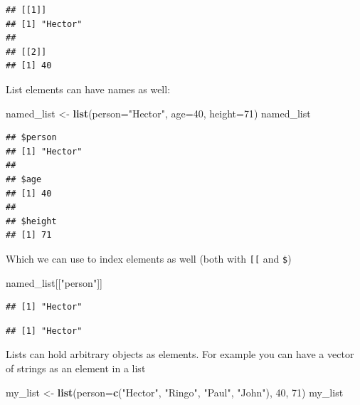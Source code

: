 \documentclass[12pt,]{book}
\newenvironment{Shaded}{\begin{snugshade}}{\end{snugshade}}
\newcommand{\KeywordTok}[1]{\textcolor[rgb]{0.13,0.29,0.53}{\textbf{#1}}}
\newcommand{\DataTypeTok}[1]{\textcolor[rgb]{0.13,0.29,0.53}{#1}}
\newcommand{\DecValTok}[1]{\textcolor[rgb]{0.00,0.00,0.81}{#1}}
\newcommand{\StringTok}[1]{\textcolor[rgb]{0.31,0.60,0.02}{#1}}
\newcommand{\OperatorTok}[1]{\textcolor[rgb]{0.81,0.36,0.00}{\textbf{#1}}}
\newcommand{\NormalTok}[1]{#1}
\theoremstyle{definition}
\theoremstyle{definition}
\theoremstyle{remark}
\begin{document}
\begin{verbatim}
## [[1]]
## [1] "Hector"
## 
## [[2]]
## [1] 40
\end{verbatim}

List elements can have names as well:

\begin{Shaded}
\begin{Highlighting}[]
\NormalTok{named_list <-}\StringTok{ }\KeywordTok{list}\NormalTok{(}\DataTypeTok{person=}\StringTok{"Hector"}\NormalTok{, }\DataTypeTok{age=}\DecValTok{40}\NormalTok{, }\DataTypeTok{height=}\DecValTok{71}\NormalTok{)}
\NormalTok{named_list}
\end{Highlighting}
\end{Shaded}

\begin{verbatim}
## $person
## [1] "Hector"
## 
## $age
## [1] 40
## 
## $height
## [1] 71
\end{verbatim}

Which we can use to index elements as well (both with \texttt{{[}{[}}
and \texttt{\$})

\begin{Shaded}
\begin{Highlighting}[]
\NormalTok{named_list[[}\StringTok{"person"}\NormalTok{]]}
\end{Highlighting}
\end{Shaded}

\begin{verbatim}
## [1] "Hector"
\end{verbatim}

\begin{Shaded}
\end{Shaded}

\begin{verbatim}
## [1] "Hector"
\end{verbatim}

Lists can hold arbitrary objects as elements. For example you can have a
vector of strings as an element in a list

\begin{Shaded}
\begin{Highlighting}[]
\NormalTok{my_list <-}\StringTok{ }\KeywordTok{list}\NormalTok{(}\DataTypeTok{person=}\KeywordTok{c}\NormalTok{(}\StringTok{"Hector"}\NormalTok{, }\StringTok{"Ringo"}\NormalTok{, }\StringTok{"Paul"}\NormalTok{, }\StringTok{"John"}\NormalTok{), }\DecValTok{40}\NormalTok{, }\DecValTok{71}\NormalTok{)}
\NormalTok{my_list}
\end{Highlighting}
\end{Shaded}
\end{document}

